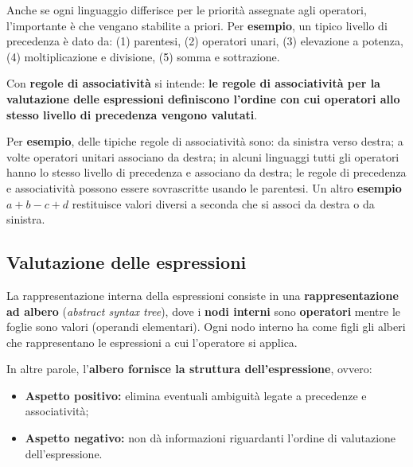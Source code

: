 \documentclass[a4paper]{article}
\begin{document}
	\noindent
	Anche se ogni linguaggio differisce per le priorità assegnate agli operatori, l'importante è che vengano stabilite a priori. Per \textcolor{Green4}{\textbf{esempio}}, un tipico livello di precedenza è dato da: (1) parentesi, (2) operatori unari, (3) elevazione a potenza, (4) moltiplicazione e divisione, (5) somma e sottrazione.\newline
	
	\noindent
	\begin{boxdef}
		Con \textcolor{Red3}{\textbf{regole di associatività}} si intende: \textbf{le regole di associatività per la valutazione delle espressioni definiscono l'ordine con cui operatori allo stesso livello di precedenza vengono valutati}.
	\end{boxdef}

	\noindent
	Per \textcolor{Green4}{\textbf{esempio}}, delle tipiche regole di associatività sono: da sinistra verso destra; a volte operatori unitari associano da destra; in alcuni linguaggi tutti gli operatori hanno lo stesso livello di precedenza e associano da destra; le regole di precedenza e associatività possono essere sovrascritte usando le parentesi.\newline
	Un altro \textcolor{Green4}{\textbf{esempio}} $a+b-c+d$ restituisce valori diversi a seconda che si associ da destra o da sinistra.\newpage
	
	\subsection{Valutazione delle espressioni}\label{valutazione delle espressioni}
	
	La rappresentazione interna della espressioni consiste in una \textbf{rappresentazione ad albero} (\emph{abstract syntax tree}), dove i \textbf{nodi interni} sono \textbf{operatori} mentre le foglie sono valori (operandi elementari). Ogni nodo interno ha come figli gli alberi che rappresentano le espressioni a cui l'operatore si applica.\newline
	
	\noindent
	In altre parole, l'\textbf{albero fornisce la struttura dell'espressione}, ovvero:
	\begin{itemize}
		\item \textcolor{Green4}{\textbf{Aspetto positivo:}} elimina eventuali ambiguità legate a precedenze e associatività;
		\item \textcolor{Red3}{\textbf{Aspetto negativo:}} non dà informazioni riguardanti l'ordine di valutazione dell'espressione.
	\end{itemize}
	
\end{document}
